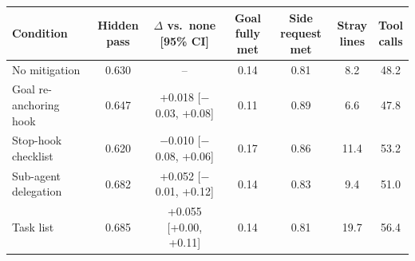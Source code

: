 \begin{tabular}{lcccccc}
\toprule
Condition & \makecell{Hidden\\pass} & \makecell{$\Delta$ vs.\ none\\{}[95\% CI]} & \makecell{Goal\\fully met} & \makecell{Side request\\met} & \makecell{Stray\\lines} & \makecell{Tool\\calls} \\
\midrule
No mitigation & 0.630 & -- & 0.14 & 0.81 & 8.2 & 48.2 \\
Goal re-anchoring hook & 0.647 & +0.018 [$-$0.03, +0.08] & 0.11 & 0.89 & 6.6 & 47.8 \\
Stop-hook checklist & 0.620 & $-$0.010 [$-$0.08, +0.06] & 0.17 & 0.86 & 11.4 & 53.2 \\
Sub-agent delegation & 0.682 & +0.052 [$-$0.01, +0.12] & 0.14 & 0.83 & 9.4 & 51.0 \\
Task list & 0.685 & +0.055 [+0.00, +0.11] & 0.14 & 0.81 & 19.7 & 56.4 \\
\bottomrule
\end{tabular}
